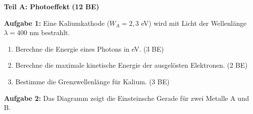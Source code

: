 \documentclass[11pt,a4paper]{article}
\begin{document}
\vspace{0.5em}


{\large\textbf{Teil A: Photoeffekt}} \hfill \textbf{(12 BE)}

\vspace{0.3em}

\textbf{Aufgabe 1:} Eine Kaliumkathode ($W_A = 2{,}3$ eV) wird mit Licht der Wellenlänge $\lambda = 400$ nm bestrahlt.

\begin{enumerate}[label=\alph*)]
\item Berechne die Energie eines Photons in eV. \hfill (3 BE)

\vspace{2cm}

\item Berechne die maximale kinetische Energie der ausgelösten Elektronen. \hfill (2 BE)

\vspace{1.5cm}

\item Bestimme die Grenzwellenlänge für Kalium. \hfill (3 BE)

\vspace{2cm}

\end{enumerate}

\textbf{Aufgabe 2:} Das Diagramm zeigt die Einsteinsche Gerade für zwei Metalle A und B.
\end{document}
